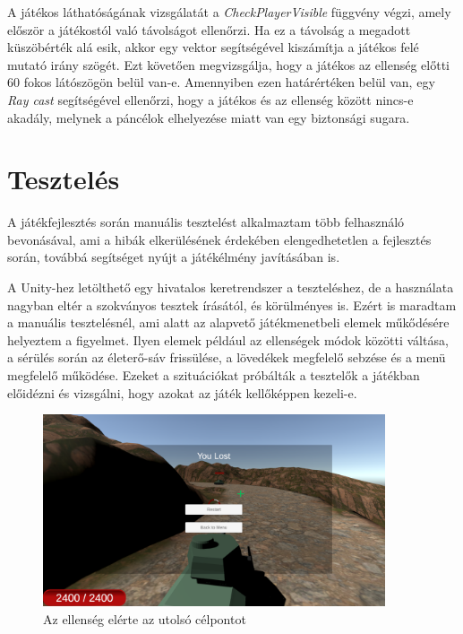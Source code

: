 \documentclass[
]{thesis-ekf}
\theoremstyle{definition}
\theoremstyle{remark}
\begin{document}


A játékos láthatóságának vizsgálatát a \emph{CheckPlayerVisible} függvény végzi, amely először a játékostól való távolságot ellenőrzi. Ha ez a távolság a megadott küszöbérték alá esik, akkor egy vektor segítségével kiszámítja a játékos felé mutató irány szögét. Ezt követően megvizsgálja, hogy a játékos az ellenség előtti 60 fokos látószögön belül van-e. Amennyiben ezen határértéken belül van, egy \emph{Ray cast} segítségével ellenőrzi, hogy a játékos és az ellenség között nincs-e akadály, melynek a páncélok elhelyezése miatt van egy biztonsági sugara.

\chapter{Tesztelés}

A játékfejlesztés során manuális tesztelést\cite{manualtesting} alkalmaztam több felhasználó bevonásával, ami a hibák elkerülésének érdekében elengedhetetlen a fejlesztés során, továbbá segítséget nyújt a játékélmény javításában is.

A Unity-hez letölthető egy hivatalos keretrendszer a teszteléshez, de a használata nagyban eltér a szokványos tesztek írásától, és körülményes is. Ezért is maradtam a manuális tesztelésnél, ami alatt az alapvető játékmenetbeli elemek műkődésére helyeztem a figyelmet. Ilyen elemek például az ellenségek módok közötti váltása, a sérülés során az életerő-sáv frissülése, a lövedékek megfelelő sebzése és a menü megfelelő működése. Ezeket a szituációkat próbálták a tesztelők a játékban előidézni és vizsgálni, hogy azokat az játék kellőképpen kezeli-e.

\begin{figure}[H]
    \centering
    \includegraphics[width=0.9\textwidth]{screenshots/losegame.png}
    \caption{Az ellenség elérte az utolsó célpontot}
    \label{fig:losegame}
\end{figure}
\end{document}
